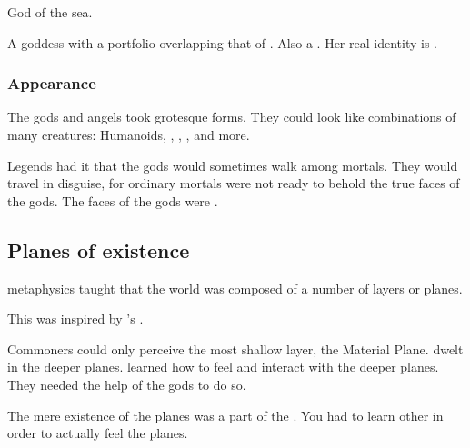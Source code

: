 \begin{gloss}
  \begin{comment}
  \subparagraph{Shellagh}
  \end{comment}
  God of the sea. 
  
  
  
  \begin{comment}
  \subparagraph{\Usherain}
  \end{comment}
  \gitemlink[Usherain]{\Usherain}
  \index{\Usherain}
  A goddess with a portfolio overlapping that of . 
  Also a .
  Her real identity is . 



\end{gloss}





\subsubsection{Appearance}
The \Ortaican gods and angels took grotesque forms.
They could look like combinations of many creatures:
Humanoids, \nycans, \lothae, \murocs,  and more. 

Legends had it that the gods would sometimes walk among mortals. 
They would travel in disguise, for ordinary mortals were not ready to behold the true faces of the gods. 
The faces of the gods were \arcana. 









\subsection{Planes of existence}
\Rethyax metaphysics taught that the world was composed of a number of layers or planes. 

This was inspired by \Sethicus's . 

Commoners could only perceive the most shallow layer, the Material Plane. 
\Daimonia dwelt in the deeper planes. 
\Rethyaxes learned how to feel and interact with the deeper planes. 
They needed the help of the gods to do so. 

The mere existence of the planes was a part of the .
You had to learn other \arcana in order to actually feel the planes. 

